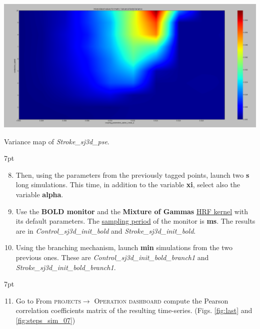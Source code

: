 \documentclass{tufte-handout}
\newenvironment{formal}{%
  \def\FrameCommand{%
    \hspace{1pt}%
    {\color{DarkBlue}\vrule width 2pt}%
    {\color{formalshade}\vrule width 4pt}%
    \colorbox{formalshade}%
  }%
  \MakeFramed{\advance\hsize-\width\FrameRestore}%
  \noindent\hspace{-4.55pt}%
  \begin{adjustwidth}{}{7pt}%
  \vspace{2pt}\vspace{2pt}%
}
{%
  \vspace{2pt}\end{adjustwidth}\endMakeFramed%
}
\newenvironment{simulation}{%
  \def\FrameCommand{%
    \hspace{1pt}%
    {\color{ForestGreen}\vrule width 2pt}%
    {\color{simulationshade}\vrule width 4pt}%
    \colorbox{simulationshade}%
  }%
  \MakeFramed{\advance\hsize-\width\FrameRestore}%
  \noindent\hspace{-4.55pt}%
  \begin{adjustwidth}{}{7pt}%
  \vspace{2pt}\vspace{2pt}%
}
{%
  \vspace{2pt}\end{adjustwidth}\endMakeFramed%
}
\begin{document}
  \begin{marginfigure}
\includegraphics[width=0.82\linewidth]{Handout_UI_ModellingStructuralLesions_StrokeSJ3DPSE}
  \caption{Variance map of \textit{Stroke\_sj3d\_pse}.}
  \label{fig:sj3d_stroke}
\end{marginfigure}


\begin{simulation}
\begin{enumerate}[resume]
\setcounter{enumi}{7}
  \item Then, using the parameters from the previously tagged points, launch two \textbf{\unit[60]{s}} long simulations. This time, in addition to the variable \textbf{xi}, select also the variable \textbf{alpha}.
  \item  Use the \textbf{BOLD monitor} and the \textbf{Mixture of Gammas} \underline{HRF kernel} with its default parameters. The \underline{sampling period} of the monitor is \textbf{\unit[2000]{ms}}. The results are in \textit{Control\_sj3d\_init\_bold} and \textit{Stroke\_sj3d\_init\_bold}.
  \item Using the branching mechanism, launch \textbf{\unit[4]{min}} simulations from the two previous ones. These are \textit{Control\_sj3d\_init\_bold\_branch1} and \textit{Stroke\_sj3d\_init\_bold\_branch1}.
  \end{enumerate}
\end{simulation}

\newpage

\begin{formal}
\begin{enumerate}[resume]
\setcounter{enumi}{10}
\item Go to From \textsc{projects}$\rightarrow$ \textsc{Operation dashboard} compute the Pearson correlation coefficients matrix of the resulting time-series. (Figs. \ref{fig:last} and \ref{fig:steps_sim_07}) 
  \end{enumerate}
\end{formal}
\end{document}

